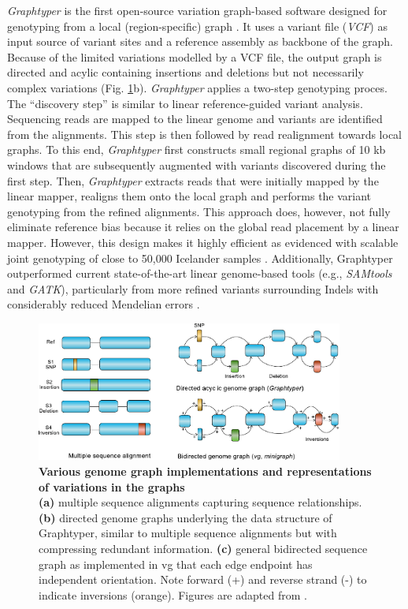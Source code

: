 \documentclass[../main.tex]{subfiles}
\begin{document}
\emph{Graphtyper }is the first open-source variation graph-based software designed for genotyping from a local (region-specific) graph \citep{eggertsson2017graphtyper,eggertsson2019graphtyper2}. It uses a variant file (\emph{VCF}) as input source of variant sites and a reference assembly as backbone of the graph. Because of the limited variations modelled by a VCF file, the output graph is directed and acylic containing insertions and deletions but not necessarily complex variations (Fig. \ref{fig15:mut}b). \emph{Graphtyper} applies a two-step genotyping proces. The  “discovery step” is similar to linear reference-guided variant analysis. Sequencing reads are mapped to the linear genome and variants are identified from the alignments. This step is then followed by read realignment towards local graphs. To this end, \emph{Graphtyper} first constructs small regional graphs of 10 kb windows that are subsequently augmented with variants discovered during the first step. Then, \emph{Graphtyper} extracts reads that were initially mapped by the linear mapper, realigns them onto the local graph and performs the variant genotyping from the refined alignments. This approach does, however, not  fully  eliminate reference bias because it relies on the global read placement by a linear mapper. However, this design makes it highly efficient as evidenced with scalable joint genotyping of close to 50,000 Icelander samples \citep{eggertsson2019graphtyper2}. Additionally, Graphtyper outperformed current state-of-the-art linear genome-based tools (e.g., \emph{SAMtools} and \emph{GATK}), particularly from more refined variants surrounding Indels with considerably reduced Mendelian errors \citep{eggertsson2017graphtyper}.

\begin{figure}[!htb]
    \centering
    \includegraphics[width=0.9\textwidth]{intro/fig5.pdf}
        \vspace{3mm}
        \caption[Genetic variant representation in the genome graphs]{\textbf{Various genome graph implementations and representations of variations in the graphs} \\
        \footnotesize{\textbf{(a)} multiple sequence alignments capturing sequence relationships. \textbf{(b)} directed genome graphs underlying the data structure of Graphtyper, similar to multiple sequence alignments but with compressing redundant information. \textbf{(c)} general bidirected sequence graph as implemented in vg that each edge endpoint has independent orientation. Note  forward (+) and reverse strand (-) to indicate inversions (orange). Figures are adapted from \citep{eizenga2020pangenome}.}}
        \label{fig15:mut}
\end{figure}
\end{document}
